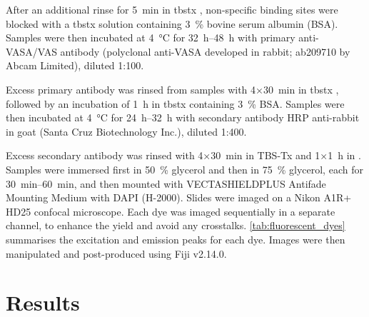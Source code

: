 After an additional rinse for \qty{5}{\minute} in \gls{tbstx} \zeroonepercent{}, non-specific binding sites were blocked with a \gls{tbstx} \zeroonepercent{} solution containing \qty{3}{\percent} bovine serum albumin (BSA). Samples were then incubated at \qty{4}{\degreeCelsius} for \qtyrange{32}{48}{\hour} with primary anti-VASA/VAS antibody (polyclonal anti-VASA developed in rabbit; ab209710 by Abcam Limited), diluted 1:100.

Excess primary antibody was rinsed from samples with 4×\qty{30}{\minute} in \gls{tbstx} \zeroonepercent{}, followed by an incubation of \qty{1}{\hour} in \gls{tbstx} \zeroonepercent{} containing \qty{3}{\percent} BSA. Samples were then incubated at \qty{+4}{\degreeCelsius} for \qtyrange{24}{32}{\hour} with secondary antibody HRP anti-rabbit in goat (Santa Cruz Biotechnology Inc.), diluted 1:400.

Excess secondary antibody was rinsed with 4×\qty{30}{\minute} in TBS-Tx \zeroonepercent{} and 1×\qty{1}{\hour} in  \onepercent{}. Samples were immersed first in \qty{50}{\percent} glycerol and then in \qty{75}{\percent} glycerol, each for \qtyrange{30}{60}{\minute}, and then mounted with VECTASHIELD\textregistered PLUS Antifade Mounting Medium with DAPI (H-2000). Slides were imaged on a Nikon A1R+ HD25 confocal microscope. Each dye was imaged sequentially in a separate channel, to enhance the yield and avoid any crosstalks. \cref{tab:fluorescent_dyes} summarises the excitation and emission peaks for each dye. Images were then manipulated and post-produced using Fiji v2.14.0.

\section{Results} \label{chapter:insitu-results}
